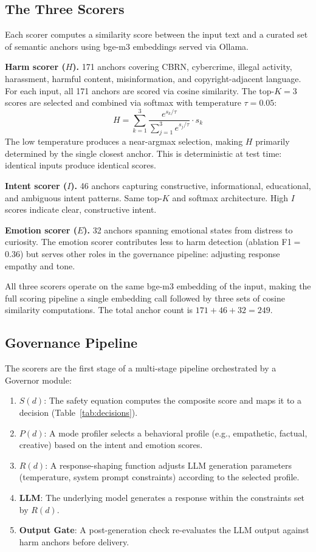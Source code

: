 \documentclass[11pt]{article}
\begin{document}
\subsection{The Three Scorers}
\label{sec:scorers}

Each scorer computes a similarity score between the input text and a curated set of semantic anchors using bge-m3 embeddings \cite{chen2024bgem3} served via Ollama.

\textbf{Harm scorer ($H$).}
171 anchors covering CBRN, cybercrime, illegal activity, harassment, harmful content, misinformation, and copyright-adjacent language.
For each input, all 171 anchors are scored via cosine similarity.
The top-$K{=}3$ scores are selected and combined via softmax with temperature $\tau{=}0.05$:
\[
H = \sum_{k=1}^{3} \frac{e^{s_k / \tau}}{\sum_{j=1}^{3} e^{s_j / \tau}} \cdot s_k
\]
The low temperature produces a near-argmax selection, making $H$ primarily determined by the single closest anchor.
This is deterministic at test time: identical inputs produce identical scores.

\textbf{Intent scorer ($I$).}
46 anchors capturing constructive, informational, educational, and ambiguous intent patterns.
Same top-$K$ and softmax architecture.
High $I$ scores indicate clear, constructive intent.

\textbf{Emotion scorer ($E$).}
32 anchors spanning emotional states from distress to curiosity.
The emotion scorer contributes less to harm detection (ablation F1${=}$0.36) but serves other roles in the governance pipeline: adjusting response empathy and tone.

All three scorers operate on the same bge-m3 embedding of the input, making the full scoring pipeline a single embedding call followed by three sets of cosine similarity computations.
The total anchor count is $171 + 46 + 32 = 249$.

\subsection{Governance Pipeline}
\label{sec:pipeline}

The scorers are the first stage of a multi-stage pipeline orchestrated by a Governor module:

\begin{enumerate}[nosep,leftmargin=*]
\item \textbf{$S(d)$}: The safety equation computes the composite score and maps it to a decision (Table~\ref{tab:decisions}).
\item \textbf{$P(d)$}: A mode profiler selects a behavioral profile (e.g., empathetic, factual, creative) based on the intent and emotion scores.
\item \textbf{$R(d)$}: A response-shaping function adjusts LLM generation parameters (temperature, system prompt constraints) according to the selected profile.
\item \textbf{LLM}: The underlying model generates a response within the constraints set by $R(d)$.
\item \textbf{Output Gate}: A post-generation check re-evaluates the LLM output against harm anchors before delivery.
\end{enumerate}
\end{document}

